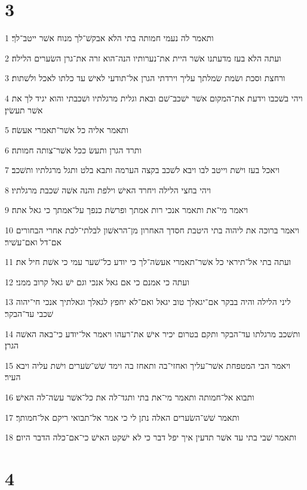 \chapter{3}

\par 1 ותאמר לה נעמי חמותה בתי הלא אבקשׁ־לך מנוח אשׁר ייטב־לך׃
\par 2 ועתה הלא בעז מדעתנו אשׁר היית את־נערותיו הנה־הוא זרה את־גרן השׂערים הלילה׃
\par 3 ורחצת וסכת ושׂמת שׂמלתך עליך וירדתי הגרן אל־תודעי לאישׁ עד כלתו לאכל ולשׁתות׃
\par 4 ויהי בשׁכבו וידעת את־המקום אשׁר ישׁכב־שׁם ובאת וגלית מרגלתיו ושׁכבתי והוא יגיד לך את אשׁר תעשׂין׃
\par 5 ותאמר אליה כל אשׁר־תאמרי אעשׂה׃
\par 6 ותרד הגרן ותעשׂ ככל אשׁר־צותה חמותה׃
\par 7 ויאכל בעז וישׁת וייטב לבו ויבא לשׁכב בקצה הערמה ותבא בלט ותגל מרגלתיו ותשׁכב׃
\par 8 ויהי בחצי הלילה ויחרד האישׁ וילפת והנה אשׁה שׁכבת מרגלתיו׃
\par 9 ויאמר מי־את ותאמר אנכי רות אמתך ופרשׂת כנפך על־אמתך כי גאל אתה׃
\par 10 ויאמר ברוכה את ליהוה בתי היטבת חסדך האחרון מן־הראשׁון לבלתי־לכת אחרי הבחורים אם־דל ואם־עשׁיר׃
\par 11 ועתה בתי אל־תיראי כל אשׁר־תאמרי אעשׂה־לך כי יודע כל־שׁער עמי כי אשׁת חיל את׃
\par 12 ועתה כי אמנם כי אם גאל אנכי וגם ישׁ גאל קרוב ממני׃
\par 13 ליני הלילה והיה בבקר אם־יגאלך טוב יגאל ואם־לא יחפץ לגאלך וגאלתיך אנכי חי־יהוה שׁכבי עד־הבקר׃
\par 14 ותשׁכב מרגלתו עד־הבקר ותקם בטרום יכיר אישׁ את־רעהו ויאמר אל־יודע כי־באה האשׁה הגרן׃
\par 15 ויאמר הבי המטפחת אשׁר־עליך ואחזי־בה ותאחז בה וימד שׁשׁ־שׂערים וישׁת עליה ויבא העיר׃
\par 16 ותבוא אל־חמותה ותאמר מי־את בתי ותגד־לה את כל־אשׁר עשׂה־לה האישׁ׃
\par 17 ותאמר שׁשׁ־השׂערים האלה נתן לי כי אמר אל־תבואי ריקם אל־חמותך׃
\par 18 ותאמר שׁבי בתי עד אשׁר תדעין איך יפל דבר כי לא ישׁקט האישׁ כי־אם־כלה הדבר היום׃

\chapter{4}

